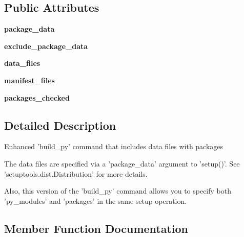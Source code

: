 \subsection*{Public Attributes}
\begin{DoxyCompactItemize}
\item 
\mbox{\label{classsetuptools_1_1command_1_1build__py_1_1build__py_a8f8100423fe5e05b57219cc00bf02568}} 
{\bfseries package\+\_\+data}
\item 
\mbox{\label{classsetuptools_1_1command_1_1build__py_1_1build__py_a33b6b204c8d3b70c09bbe86665dc15ec}} 
{\bfseries exclude\+\_\+package\+\_\+data}
\item 
\mbox{\label{classsetuptools_1_1command_1_1build__py_1_1build__py_ac7bbc5fa976c30801af286a2321a063d}} 
{\bfseries data\+\_\+files}
\item 
\mbox{\label{classsetuptools_1_1command_1_1build__py_1_1build__py_a66ea87dce6b5b5419f1558828bb92080}} 
{\bfseries manifest\+\_\+files}
\item 
\mbox{\label{classsetuptools_1_1command_1_1build__py_1_1build__py_a748973ff26b6980cef5282fa66c3ba38}} 
{\bfseries packages\+\_\+checked}
\end{DoxyCompactItemize}


\subsection{Detailed Description}
\begin{DoxyVerb}Enhanced 'build_py' command that includes data files with packages

The data files are specified via a 'package_data' argument to 'setup()'.
See 'setuptools.dist.Distribution' for more details.

Also, this version of the 'build_py' command allows you to specify both
'py_modules' and 'packages' in the same setup operation.
\end{DoxyVerb}
 

\subsection{Member Function Documentation}
\mbox{\label{classsetuptools_1_1command_1_1build__py_1_1build__py_abada4e4302bf4dbdabc9b64e63f87924}} 
